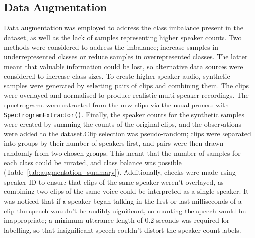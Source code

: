 \subsection{Data Augmentation}
Data augmentation was employed to address the class imbalance present in the dataset, as well as the lack of samples representing higher speaker counts. Two methods were considered to address the imbalance; increase samples in underrepresented classes or reduce samples in overrepresented classes. The latter meant that valuable information could be lost, so alternative data sources were considered to increase class sizes. To create higher speaker audio, synthetic samples were generated by selecting pairs of clips and combining them. The clips were overlayed and normalised to produce realistic multi-speaker recordings. The spectrograms were extracted from the new clips via the usual process with \lstinline!SpectrogramExtractor()!. Finally, the speaker counts for the synthetic samples were created by summing the counts of the original clips, and the observations were added to the dataset.\newline\newline Clip selection was pseudo-random; clips were separated into groups by their number of speakers first, and pairs were then drawn randomly from two chosen groups. This meant that the number of samples for each class could be curated, and class balance was possible (Table~\ref{tab:augmentation_summary}). Additionally, checks were made using speaker ID to ensure that clips of the same speaker weren't overlayed, as combining two clips of the same voice could be interpreted as a single speaker. It was noticed that if a speaker began talking in the first or last milliseconds of a clip the speech wouldn't be audibly significant, so counting the speech would be inappropriate; a minimum utterance length of $0.2$ seconds was required for labelling, so that insignificant speech couldn't distort the speaker count labels.

